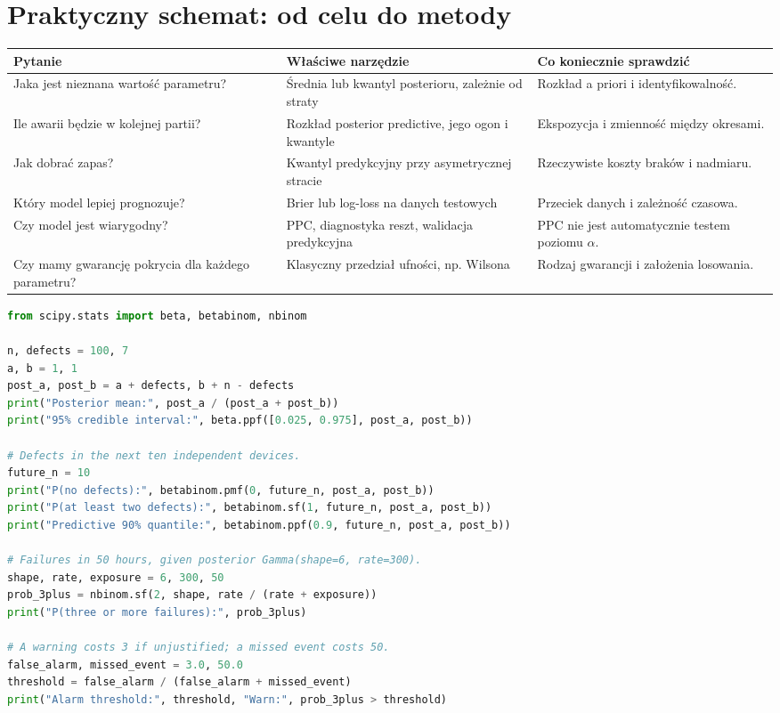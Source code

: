 \documentclass[11pt,a4paper,oneside]{report}
\numberwithin{equation}{chapter}
\theoremstyle{plain}
\theoremstyle{definition}
\theoremstyle{remark}
\begin{document}
\section{Praktyczny schemat: od celu do metody}
\begin{center}\small
\begin{tabular}{>{\raggedright\arraybackslash}p{}>{\raggedright\arraybackslash}p{}>{\raggedright\arraybackslash}p{}}
\toprule
\textbf{Pytanie} & \textbf{Właściwe narzędzie} & \textbf{Co koniecznie sprawdzić}\tabularnewline
\midrule
Jaka jest nieznana wartość parametru? & Średnia lub kwantyl posterioru, zależnie od straty & Rozkład a priori i identyfikowalność.\\
Ile awarii będzie w kolejnej partii? & Rozkład posterior predictive, jego ogon i kwantyle & Ekspozycja i zmienność między okresami.\\
Jak dobrać zapas? & Kwantyl predykcyjny przy asymetrycznej stracie & Rzeczywiste koszty braków i nadmiaru.\\
Który model lepiej prognozuje? & Brier lub log-loss na danych testowych & Przeciek danych i zależność czasowa.\\
Czy model jest wiarygodny? & PPC, diagnostyka reszt, walidacja predykcyjna & PPC nie jest automatycznie testem poziomu $\alpha$.\\
Czy mamy gwarancję pokrycia dla każdego parametru? & Klasyczny przedział ufności, np. Wilsona & Rodzaj gwarancji i założenia losowania.\\
\bottomrule
\end{tabular}
\end{center}

\begin{lstlisting}[language=Python,caption={Kompletny program: estymacja, predykcja, ryzyko alarmu i przedziały (Python, SciPy).}]
from scipy.stats import beta, betabinom, nbinom

n, defects = 100, 7
a, b = 1, 1
post_a, post_b = a + defects, b + n - defects
print("Posterior mean:", post_a / (post_a + post_b))
print("95% credible interval:", beta.ppf([0.025, 0.975], post_a, post_b))

# Defects in the next ten independent devices.
future_n = 10
print("P(no defects):", betabinom.pmf(0, future_n, post_a, post_b))
print("P(at least two defects):", betabinom.sf(1, future_n, post_a, post_b))
print("Predictive 90% quantile:", betabinom.ppf(0.9, future_n, post_a, post_b))

# Failures in 50 hours, given posterior Gamma(shape=6, rate=300).
shape, rate, exposure = 6, 300, 50
prob_3plus = nbinom.sf(2, shape, rate / (rate + exposure))
print("P(three or more failures):", prob_3plus)

# A warning costs 3 if unjustified; a missed event costs 50.
false_alarm, missed_event = 3.0, 50.0
threshold = false_alarm / (false_alarm + missed_event)
print("Alarm threshold:", threshold, "Warn:", prob_3plus > threshold)
\end{lstlisting}
\end{document}
